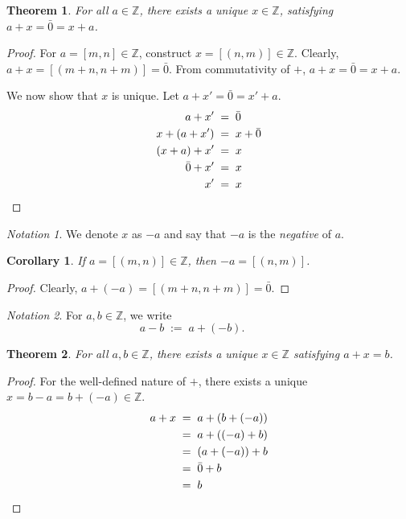 \documentclass[10pt]{article}
\newtheorem{theorem}{Theorem}[section]
\newtheorem{corollary}{Corollary}[theorem]
\theoremstyle{definition}
\theoremstyle{remark}
\newtheorem*{notation}{Notation}
\begin{document}
        \begin{theorem}
                        For all $a \in \mathbb{Z}$, there exists a unique $x \in \mathbb{Z}$, satisfying $a + x = \bar{0} = x + a$.
        \end{theorem}
        \begin{proof}
                For $a = [m, n] \in \mathbb{Z}$, construct $x = [(n, m)] \in \mathbb{Z}$.
                Clearly, $a + x = [(m + n, n + m)] = \bar{0}$.
                From commutativity of $+$, $a + x = \bar{0} = x + a$.

                We now show that $x$ is unique. Let $a + x' = \bar{0} = x' + a$.
                \begin{align*}
                        a + x' \;&=\; \bar{0} \\
                        x + (a + x') \;&=\; x + \bar{0} \\
                        (x + a) + x' \;&=\; x \\
                        \bar{0} + x' \;&=\; x \\
                        x' \;&=\; x     \qedhere
                \end{align*}
        \end{proof}
        \begin{notation}
                We denote $x$ as $-a$ and say that $-a$ is the \textit{negative} of $a$.
        \end{notation}
        \begin{corollary}
                If $a = [(m, n)] \in \mathbb{Z}$, then $-a = [(n, m)]$.
        \end{corollary}
        \begin{proof}
                Clearly, $a + (-a) = [(m + n, n + m)] = \bar{0}$.
        \end{proof}
        \begin{notation}
                For $a, b \in \mathbb{Z}$, we write
                \[
                a - b \;:=\; a + (-b).\quad\quad\quad
                \]
        \end{notation}

        \begin{theorem}
                        For all $a, b \in \mathbb{Z}$, there exists a unique $x \in \mathbb{Z}$ satisfying $a + x = b$.
        \end{theorem}
        \begin{proof}
                For the well-defined nature of $+$, there exists a unique $x = b - a = b + (-a) \in \mathbb{Z}$.
                \begin{align*}
                        a + x \;&=\; a + (b + (-a)) \\
                                \;&=\; a + ((-a) + b) \\
                                \;&=\; (a + (-a)) + b \\
                                \;&=\; \bar{0} + b \\
                                \;&=\; b \qedhere
                \end{align*}
        \end{proof}
\end{document}
